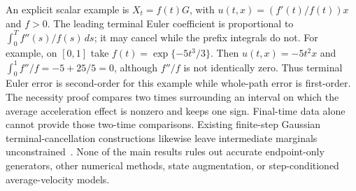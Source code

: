 An explicit scalar example is $X_t=f(t)G$, with
$u(t,x)=(f'(t)/f(t))x$ and $f>0$. The leading terminal Euler coefficient
is proportional to $\int_0^T f''(s)/f(s)\,ds$; it may cancel while the
prefix integrals do not. For example, on $[0,1]$ take
$f(t)=\exp\{-5t^3/3\}$. Then $u(t,x)=-5t^2x$ and
$\int_0^1 f''/f=-5+25/5=0$, although $f''/f$ is not identically
zero. Thus terminal Euler error is second-order for this example while
whole-path error is first-order. The necessity proof compares two times
surrounding an interval on which the average acceleration effect is
nonzero and keeps one sign. Final-time data alone cannot provide those
two-time comparisons. Existing finite-step
Gaussian terminal-cancellation constructions likewise leave intermediate
marginals unconstrained~\citep{obzherin2026finite}. None of the main
results rules out accurate endpoint-only generators, other numerical
methods, state augmentation, or step-conditioned average-velocity models.
